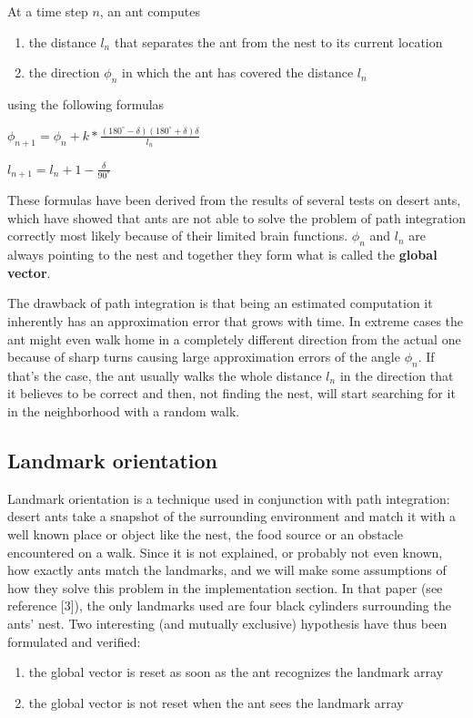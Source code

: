 \documentclass[11pt]{article}
\begin{document}
At a time step $n$, an ant computes
\begin{enumerate}
\item the distance $l_n$ that separates the ant from the nest to its current location
\item the direction $\phi_n$ in which the ant has covered the distance $l_n$
\end{enumerate}

using the following formulas

\begin{center}
$\phi_{n+1} = \phi_n + k*\frac{(180^{\circ} - \delta)(180^{\circ} + \delta) \delta}{l_n}$
\end{center}
\begin{center}
$l_{n+1} = l_n + 1 - \frac{\delta}{90^{\circ}}$
\end{center}

These formulas have been derived from the results of several tests on desert ants, which have showed that ants are not able to solve the problem of path integration correctly most likely because of their limited brain functions. $\phi_n$ and $l_n$ are always pointing to the nest and together they form what is called the \textbf{global vector}.

The drawback of path integration is that being an estimated computation it inherently has an approximation error that grows with time. In extreme cases the ant might even walk home in a completely different direction from the actual one because of sharp turns causing large approximation errors of the angle $\phi_n$. If that's the case, the ant usually walks the whole distance $l_n$ in the direction that it believes to be correct and then, not finding the nest, will start searching for it in the neighborhood with a random walk.

\subsection{Landmark orientation}

Landmark orientation is a technique used in conjunction with path integration: desert ants take a snapshot of the surrounding environment and match it with a well known place or object like the nest, the food source or an obstacle encountered on a walk. Since it is not explained, or probably not even known, how exactly ants match the landmarks, and we will make some assumptions of how they solve this problem in the implementation section. In that paper (see reference [3]), the only landmarks used are four black cylinders surrounding the ants' nest. Two interesting (and mutually exclusive) hypothesis have thus been formulated and verified:
\begin{enumerate}
\item the global vector is reset as soon as the ant recognizes the landmark array
\item the global vector is not reset when the ant sees the landmark array
\end{enumerate}
\end{document}
